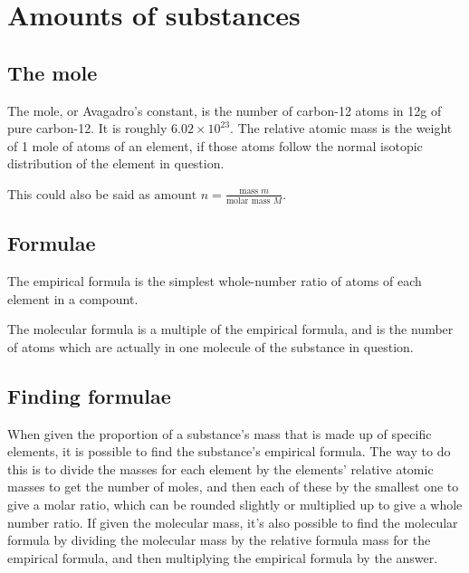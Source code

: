 \section{Amounts of substances}
\subsection{The mole}
The mole, or Avagadro's constant, is the number of carbon-12 atoms in 12g of pure carbon-12. It is roughly $6.02\times 10^{23}$. The relative atomic mass is the weight of 1 mole of atoms of an element, if those atoms follow the normal isotopic distribution of the element in question.

This could also be said as $\text{amount } n = \frac{\text{mass } m}{\text{molar mass } M}$.

\subsection{Formulae}
The empirical formula is the simplest whole-number ratio of atoms of each element in a compount.

The molecular formula is a multiple of the empirical formula, and is the number of atoms which are actually in one molecule of the substance in question.

\subsection{Finding formulae}
When given the proportion of a substance's mass that is made up of specific elements, it is possible to find the substance's empirical formula. The way to do this is to divide the masses for each element by the elements' relative atomic masses to get the number of moles, and then each of these by the smallest one to give a molar ratio, which can be rounded slightly or multiplied up to give a whole number ratio. If given the molecular mass, it's also possible to find the molecular formula by dividing the molecular mass by the relative formula mass for the empirical formula, and then multiplying the empirical formula by the answer.
